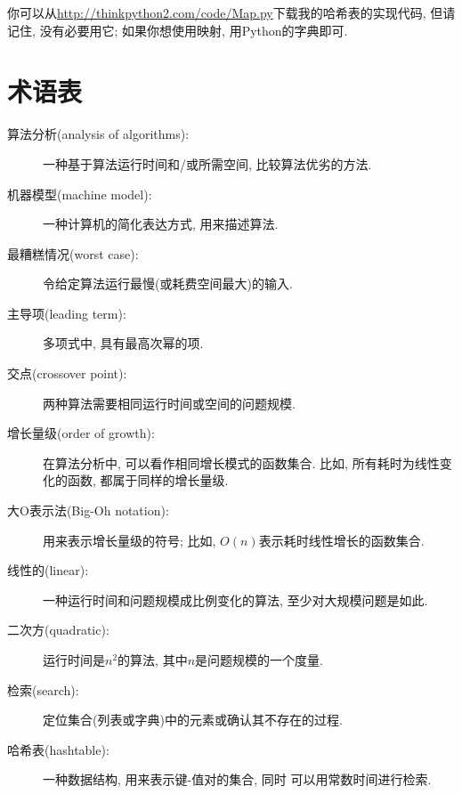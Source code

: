 \documentclass[10pt]{book}
\begin{document}
你可以从\url{http://thinkpython2.com/code/Map.py}下载我的哈希表的实现代码,
但请记住, 没有必要用它; 如果你想使用映射, 用Python的字典即可.

\section{术语表}

\begin{description}

\item[算法分析(analysis of algorithms):] 一种基于算法运行时间和/或所需空间, 比较算法优劣的方法. 

\item[机器模型(machine model):] 一种计算机的简化表达方式, 用来描述算法.

\item[最糟糕情况(worst case):] 令给定算法运行最慢(或耗费空间最大)的输入.

\item[主导项(leading term):] 多项式中, 具有最高次幂的项.

\item[交点(crossover point):] 两种算法需要相同运行时间或空间的问题规模.

\item[增长量级(order of growth):] 在算法分析中, 可以看作相同增长模式的函数集合.
比如, 所有耗时为线性变化的函数, 都属于同样的增长量级.

\item[大O表示法(Big-Oh notation):] 用来表示增长量级的符号;
比如, $O(n)$表示耗时线性增长的函数集合. 

\item[线性的(linear):] 一种运行时间和问题规模成比例变化的算法,
至少对大规模问题是如此.

\item[二次方(quadratic):] 运行时间是$n^2$的算法, 其中$n$是问题规模的一个度量. 

\item[检索(search):] 定位集合(列表或字典)中的元素或确认其不存在的过程.

\item[哈希表(hashtable):] 一种数据结构, 用来表示键-值对的集合, 同时
可以用常数时间进行检索.

\end{description}


\printindex

\clearemptydoublepage
\end{document}
